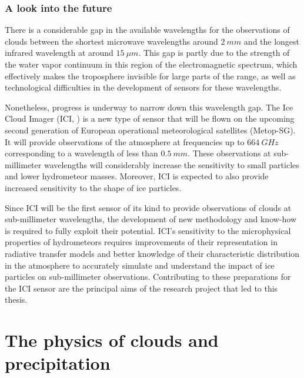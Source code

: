 \subsection{A look into the future}

There is a considerable gap in the available wavelengths for the observations of
clouds between the shortest microwave wavelengths around $2\ \unit{mm}$ and the
longest infrared wavelength at around $15\ \unit{\mu m}$. This gap is partly
due to the strength of the water vapor continuum in this region of the
electromagnetic spectrum, which effectively makes the troposphere invisible for
large parts of the range, as well as technological difficulties in the
development of sensors for these wavelengths.

Nonetheless, progress is underway to narrow down this wavelength gap. The Ice Cloud
Imager (ICI, \textcite{buehler12}) is a new type of sensor that will be flown on the upcoming second
generation of European operational meteorological satellites (Metop-SG). It will
provide observations of the atmosphere at frequencies up to $664\ \unit{GHz}$
corresponding to a wavelength of less than $0.5\ \unit{mm}$. These observations
at sub-millimeter wavelengths will considerably increase the sensitivity to small
particles and lower hydrometeor masses. Moreover, ICI is expected to also provide
increased sensitivity to the shape of ice particles.

Since ICI will be the first sensor of its kind to provide observations of clouds
at sub-millimeter wavelengths, the development of new methodology and know-how
is required to fully exploit their potential. ICI's sensitivity to the
microphysical properties of hydrometeors requires improvements of their
representation in radiative transfer models and better knowledge of their
characteristic distribution in the atmosphere to accurately simulate and
understand the impact of ice particles on sub-millimeter observations.
Contributing to these preparations for the ICI sensor are the principal aims of
the research project that led to this thesis.

%
%
%
\chapter{The physics of clouds and precipitation}
\label{ch:clouds}

